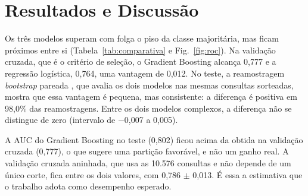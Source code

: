 \documentclass[conference]{IEEEtran}
\begin{document}
\section{Resultados e Discussão}
\begin{table}[!t]
\caption{Desempenho no cenário com 37 atributos. A coluna de validação cruzada traz a média e o desvio-padrão das cinco dobras do treino; as demais referem-se ao conjunto de teste (2.116 consultas), com intervalos de 95\% por reamostragem \textit{bootstrap}. Sensibilidade, especificidade e F1 usam o limiar fixado no treino.}
\label{tab:comparativa}
\centering
\footnotesize
\setlength{\tabcolsep}{3pt}
\end{table}

Os três modelos superam com folga o piso da classe majoritária, mas ficam próximos entre si (Tabela~\ref{tab:comparativa} e Fig.~\ref{fig:roc}). Na validação cruzada, que é o critério de seleção, o Gradient Boosting alcança 0,777 e a regressão logística, 0,764, uma vantagem de 0,012. No teste, a reamostragem \textit{bootstrap} pareada \cite{efron}, que avalia os dois modelos nas mesmas consultas sorteadas, mostra que essa vantagem é pequena, mas consistente: a diferença é positiva em 98,0\% das reamostragens. Entre os dois modelos complexos, a diferença não se distingue de zero (intervalo de $-$0,007 a 0,005).

A AUC do Gradient Boosting no teste (0,802) ficou acima da obtida na validação cruzada (0,777), o que sugere uma partição favorável, e não um ganho real. A validação cruzada aninhada, que usa as 10.576 consultas e não depende de um único corte, fica entre os dois valores, com 0,786 $\pm$ 0,013. É essa a estimativa que o trabalho adota como desempenho esperado.
\end{document}

